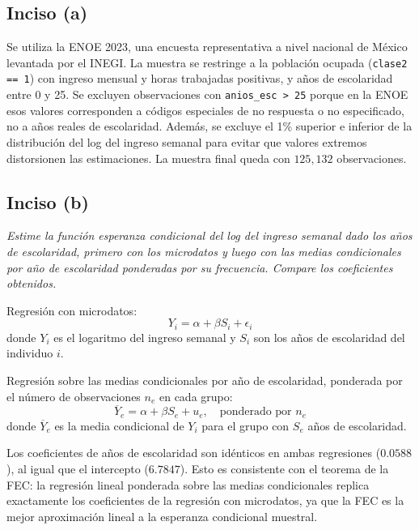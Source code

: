 \documentclass[12pt]{article}
\begin{document}
\subsection*{Inciso (a)}

Se utiliza la ENOE 2023, una encuesta representativa a nivel nacional de México levantada por el INEGI. La muestra se restringe a la población ocupada (\texttt{clase2 == 1}) con ingreso mensual y horas trabajadas positivas, y años de escolaridad entre 0 y 25. Se excluyen observaciones con \texttt{anios\_esc > 25} porque en la ENOE esos valores corresponden a códigos especiales de no respuesta o no especificado, no a años reales de escolaridad. Además, se excluye el 1\% superior e inferior de la distribución del log del ingreso semanal para evitar que valores extremos distorsionen las estimaciones. La muestra final queda con $125{,}132$ observaciones.

\subsection*{Inciso (b)}

\textit{Estime la función esperanza condicional del log del ingreso semanal dado los años de escolaridad, primero con los microdatos y luego con las medias condicionales por año de escolaridad ponderadas por su frecuencia. Compare los coeficientes obtenidos.}

Regresión con microdatos:
\begin{equation}
Y_i = \alpha + \beta S_i + \epsilon_i
\end{equation}
donde $Y_i$ es el logaritmo del ingreso semanal y $S_i$ son los años de escolaridad del individuo $i$.

Regresión sobre las medias condicionales por año de escolaridad, ponderada por el número de observaciones $n_e$ en cada grupo:
\begin{equation}
\overline{Y}_e = \alpha + \beta S_e + u_e, \quad \text{ponderado por } n_e
\end{equation}
donde $\overline{Y}_e$ es la media condicional de $Y_i$ para el grupo con $S_e$ años de escolaridad.



Los coeficientes de años de escolaridad son idénticos en ambas regresiones ($0.0588$), al igual que el intercepto ($6.7847$). Esto es consistente con el teorema de la FEC: la regresión lineal ponderada sobre las medias condicionales replica exactamente los coeficientes de la regresión con microdatos, ya que la FEC es la mejor aproximación lineal a la esperanza condicional muestral.
\end{document}
